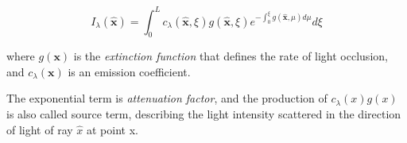 \begin{equation}
I_\lambda(\hat{\mathbf{x}})=
\int_0^L c_\lambda(\hat{\mathbf{x}}, \xi)
g(\hat{\mathbf{x}},\xi)
e^{-\int_0^\xi g(\hat{\mathbf{x}},\mu)d\mu}
d\xi
\label{eq:volume_render_equation}
\end{equation}

where $g(\mathbf{x})$ is the \textit{extinction function}
that defines the rate of light occlusion, 
and $c_\lambda(\mathbf{x})$ is an emission coefficient.

The exponential term is \textit{attenuation factor}, 
and the production of $c_\lambda(x)g(x)$ is also called source term, 
describing the light intensity scattered in the direction of light of ray 
$\hat{x}$ at point x.



